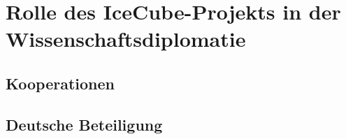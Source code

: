 \chapter{Rolle des IceCube-Projekts in der Wissenschaftsdiplomatie} 
    \vspace{8pt}
    \section{Kooperationen}
    \section{Deutsche Beteiligung}